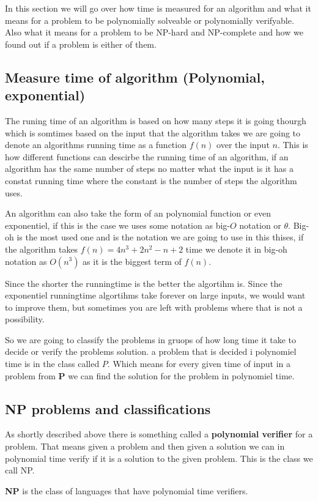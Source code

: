 In this section we will go over how time is measured for an algorithm and what it means for a problem to be polynomially solveable or polynomially verifyable. Also what it means for a problem to be NP-hard and NP-complete and how we found out if a problem is either of them. 

\subsection{Measure time of algorithm (Polynomial, exponential)}
The runing time of an algorithm is based on how many steps it is going thourgh which is somtimes based on the input that the algorithm takes we are going to denote an algorithms running time as a function $f(n)$ over the input $n$. 
This is how different functions can descirbe the running time of an algorithm, if an algorithm has the same number of steps no matter what the input is it has a constat running time where the constant is the number of steps the algorithm uses. 

An algorithm can also take the form of an polynomial function or even exponentiel, if this is the case we uses some notation as big-$O$ notation or $\theta$. 
Big-oh is the most used one and is the notation we are going to use in this thises, if the algorithm takes $f(n)=4n^3 +2n^2-n+2$ time we denote it in big-oh notation as $O(n^3)$ as it is the biggest term of $f(n)$.  

Since the shorter the runningtime is the better the algortihm is.
Since the exponentiel runningtime algortihms take forever on large inputs, we would want to improve them, but sometimes you are left with problems where that is not a possibility.

So we are going to classify the problems in gruops of how long time it take to decide or verify the problems solution. a problem that is decided i polynomiel time is in the class called $P$.
Which means for every given time of input in a problem from \textbf{P} we can find the solution for the problem in polynomiel time.

\subsection{NP problems and classifications}
As shortly described above there is something called a \textbf{polynomial verifier} for a problem. 
That means given a problem and then given a solution we can in polynomial time verify if it is a solution to the given problem. This is the class we call NP.
\begin{definition}
    \textbf{NP} is the class of languages that have polynomial time verifiers.
\end{definition}

